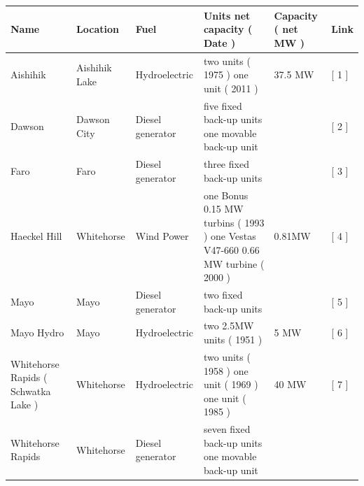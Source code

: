 \documentclass{article}
\begin{document}
\begin{tabular}{llllll}
\toprule
Name & Location & Fuel & Units net capacity ( Date ) & Capacity ( net MW ) & Link \\
\midrule
Aishihik & Aishihik Lake & Hydroelectric & two units ( 1975 ) one unit ( 2011 ) & 37.5 MW & [ 1 ] \\
Dawson & Dawson City & Diesel generator & five fixed back-up units one movable back-up unit &  & [ 2 ] \\
Faro & Faro & Diesel generator & three fixed back-up units &  & [ 3 ] \\
Haeckel Hill & Whitehorse & Wind Power & one Bonus 0.15 MW turbins ( 1993 ) one Vestas V47-660 0.66 MW turbine ( 2000 ) & 0.81MW & [ 4 ] \\
Mayo & Mayo & Diesel generator & two fixed back-up units &  & [ 5 ] \\
Mayo Hydro & Mayo & Hydroelectric & two 2.5MW units ( 1951 ) & 5 MW & [ 6 ] \\
Whitehorse Rapids ( Schwatka Lake ) & Whitehorse & Hydroelectric & two units ( 1958 ) one unit ( 1969 ) one unit ( 1985 ) & 40 MW & [ 7 ] \\
Whitehorse Rapids & Whitehorse & Diesel generator & seven fixed back-up units one movable back-up unit &  &  \\
\bottomrule
\end{tabular}
\end{document}
